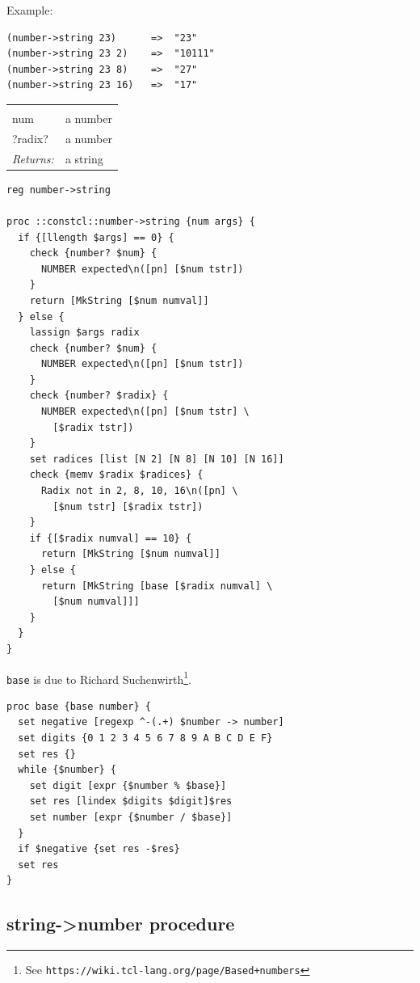 \documentclass[twoside]{report}
\begin{document}
Example:

\begin{verbatim}
(number->string 23)      =>  "23"
(number->string 23 2)    =>  "10111"
(number->string 23 8)    =>  "27"
(number->string 23 16)   =>  "17"
\end{verbatim}

\noindent\begin{tabular}{ |p{1.9cm} p{8cm}| }
\hline
\rowcolor[HTML]{CCCCCC} \multicolumn{2}{|l|}{\bf number->string (public)} \\
num & a number \\
?radix? & a number \\
\textit{Returns:} & a string \\
\hline
\end{tabular}

\begin{lstlisting}
reg number->string

proc ::constcl::number->string {num args} {
  if {[llength $args] == 0} {
    check {number? $num} {
      NUMBER expected\n([pn] [$num tstr])
    }
    return [MkString [$num numval]]
  } else {
    lassign $args radix
    check {number? $num} {
      NUMBER expected\n([pn] [$num tstr])
    }
    check {number? $radix} {
      NUMBER expected\n([pn] [$num tstr] \
        [$radix tstr])
    }
    set radices [list [N 2] [N 8] [N 10] [N 16]]
    check {memv $radix $radices} {
      Radix not in 2, 8, 10, 16\n([pn] \
        [$num tstr] [$radix tstr])
    }
    if {[$radix numval] == 10} {
      return [MkString [$num numval]]
    } else {
      return [MkString [base [$radix numval] \
        [$num numval]]]
    }
  }
}
\end{lstlisting}

\texttt{base} is due to Richard Suchenwirth\footnote{See \texttt{https://wiki.tcl-lang.org/page/Based+numbers}}.

\begin{lstlisting}
proc base {base number} {
  set negative [regexp ^-(.+) $number -> number]
  set digits {0 1 2 3 4 5 6 7 8 9 A B C D E F}
  set res {}
  while {$number} {
    set digit [expr {$number % $base}]
    set res [lindex $digits $digit]$res
    set number [expr {$number / $base}]
  }
  if $negative {set res -$res}
  set res
}
\end{lstlisting}

\subsection{string->number procedure}
\label{stringnumber-procedure}
\end{document}
